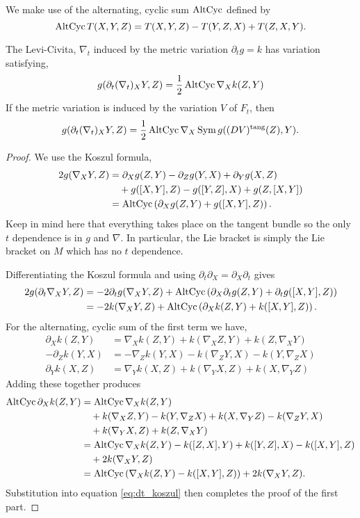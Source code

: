 We make use of the alternating, cyclic sum \(\operatorname{AltCyc}\) defined by
\[
\operatorname{AltCyc} T(X, Y, Z) = T(X, Y, Z) - T(Y, Z, X) + T(Z, X, Y).
\]

\begin{lemma}
The Levi-Civita, \(\nabla_t\) induced by the metric variation \(\partial_t g = k\) has variation satisfying,
\[
g(\partial_t (\nabla_t)_X Y, Z) = \frac{1}{2} \operatorname{AltCyc} \nabla_X k(Z, Y)
\]
If the metric variation is induced by the variation \(V\) of \(F_t\), then
\[
g(\partial_t (\nabla_t)_X Y, Z) = \frac{1}{2} \operatorname{AltCyc} \nabla_X \operatorname{Sym} g((DV)^{\operatorname{tang}} (Z), Y).
\]
\end{lemma}

\begin{proof}
We use the Koszul formula,
\[
\begin{split}
2 g(\nabla_X Y, Z) &= \partial_X g(Z, Y) - \partial_Z g(Y, X) + \partial_Y g(X, Z) \\
&\quad + g([X, Y], Z) - g([Y, Z], X) + g(Z, [X, Y]) \\
&= \operatorname{AltCyc} \left(\partial_X g(Z, Y) + g([X, Y], Z)\right).
\end{split}
\]
Keep in mind here that everything takes place on the tangent bundle so the only \(t\) dependence is in \(g\) and \(\nabla\). In particular, the Lie bracket is simply the Lie bracket on \(M\) which has no \(t\) dependence.

Differentiating the Koszul formula and using \(\partial_t \partial_X = \partial_X \partial_t\) gives
\begin{equation}
\label{eq:dt_koszul}
\begin{split}
2 g(\partial_t \nabla_X Y, Z) &= -2 \partial_t g(\nabla_X Y, Z) + \operatorname{AltCyc} \left(\partial_X \partial_t g(Z, Y) + \partial_t g([X, Y], Z)\right) \\
&= -2 k (\nabla_X Y, Z) + \operatorname{AltCyc} \left(\partial_X k (Z, Y) + k ([X, Y], Z)\right).
\end{split}
\end{equation}
For the alternating, cyclic sum of the first term we have,
\begin{align*}
\partial_X k (Z, Y) &= \nabla_X k (Z, Y) + k(\nabla_X Z, Y) + k(Z, \nabla_X Y) \\
-\partial_Z k (Y, X) &= -\nabla_Z k (Y, X) - k(\nabla_Z Y, X) - k(Y, \nabla_Z X) \\
\partial_Y k (X, Z) &= \nabla_Y k (X, Z) + k(\nabla_Y X, Z) + k(X, \nabla_Y Z)
\end{align*}
Adding these together produces
\[
\begin{split}
\operatorname{AltCyc} \partial_X k (Z, Y) &= \operatorname{AltCyc} \nabla_X k (Z, Y) \\
&\quad + k(\nabla_X Z, Y) - k(Y, \nabla_Z X) + k(X, \nabla_Y Z) - k(\nabla_Z Y, X) \\
&\quad + k(\nabla_Y X, Z) + k(Z, \nabla_X Y) \\
&= \operatorname{AltCyc} \nabla_X k (Z, Y) - k([Z, X], Y) + k([Y, Z], X) - k([X, Y], Z) \\
&\quad + 2 k(\nabla_X Y, Z) \\
&= \operatorname{AltCyc} \left(\nabla_X k (Z, Y) - k ([X, Y], Z)\right) + 2 k (\nabla_X Y, Z) .
\end{split}
\]
Substitution into equation \eqref{eq:dt_koszul} then completes the proof of the first part.


\end{proof}
